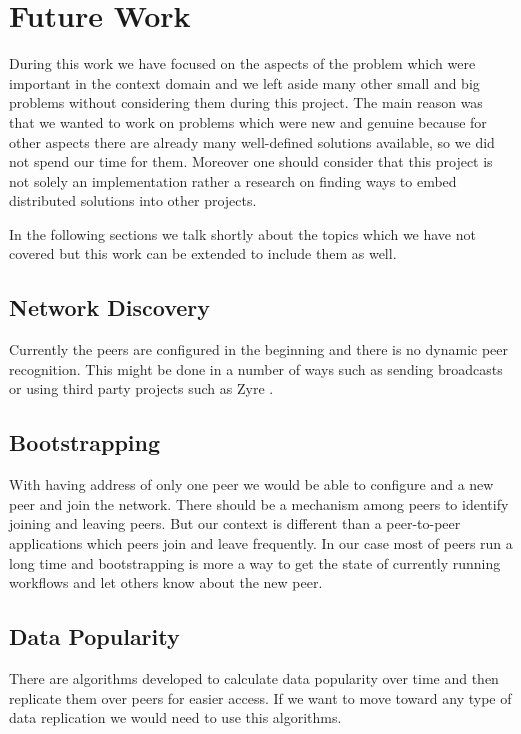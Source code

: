 \chapter{Future Work}
\label{cha:future}

During this work we have focused on the aspects of the problem which were important in the context domain and we left aside many other small and big problems without considering them during this project. The main
reason was that we wanted to work on problems which were new and genuine
because for other aspects there are already many well-defined solutions
available, so we did not spend our time for them. Moreover one should 
consider that this project is not solely an implementation rather a 
research on finding ways to embed distributed solutions into other projects.

In the following sections we talk shortly about the topics which we have
not covered but this work can be extended to include them as well.
%

\section{Network Discovery}
Currently the peers are configured in the beginning and there is no dynamic peer recognition. This might be done in a number of ways
such as sending broadcasts or using third party projects such as Zyre \cite{Zyre}.

\section{Bootstrapping}
With having address of only one peer we would be able to configure and a new peer and join the network. There should be a mechanism among
peers to identify joining and leaving peers. But our context is different than a peer-to-peer applications which peers join and leave 
frequently. In our case most of peers run a long time and bootstrapping is more a way to get the state of currently running workflows and
let others know about the new peer.

\section{Data Popularity}
There are algorithms developed to calculate data popularity over time and then replicate them over peers for easier access. If we want to 
move toward any type of data replication we would need to use this algorithms.

